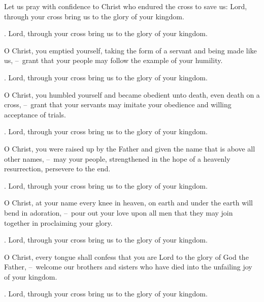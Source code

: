 \lettrine[loversize=0.15,lines=2]{L}{}et us pray with confidence to Christ who endured the cross to save us: Lord, through your cross bring us to the glory of your kingdom.
\par \Rbar. Lord, through your cross bring us to the glory of your kingdom.

O Christ, you emptied yourself, taking the form of a servant and being made like us,
– grant that your people may follow the example of your humility.
\par \Rbar. Lord, through your cross bring us to the glory of your kingdom.

O Christ, you humbled yourself and became obedient unto death, even death on a cross,
– grant that your servants may imitate your obedience and willing acceptance of trials.
\par \Rbar. Lord, through your cross bring us to the glory of your kingdom.

O Christ, you were raised up by the Father and given the name that is above all other names,
– may your people, strengthened in the hope of a heavenly resurrection, persevere to the end.
\par \Rbar. Lord, through your cross bring us to the glory of your kingdom.

O Christ, at your name every knee in heaven, on earth and under the earth will bend in adoration,
– pour out your love upon all men that they may join together in proclaiming your glory.
\par \Rbar. Lord, through your cross bring us to the glory of your kingdom.

O Christ, every tongue shall confess that you are Lord to the glory of God the Father,
– welcome our brothers and sisters who have died into the unfailing joy of your kingdom.
\par \Rbar. Lord, through your cross bring us to the glory of your kingdom.
